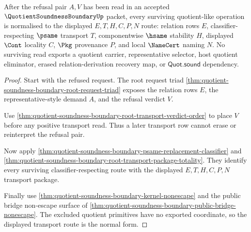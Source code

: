 \begin{theorem}
\label{thm:quotient-soundness-boundary-transport-refusal-normal-form}
After the refusal pair $A,V$ has been read in an accepted
$\QuotientSoundnessBoundaryUp$ packet, every surviving quotient-like operation
is normalised to the displayed $E,T,H,C,P,N$ route: relation rows $E$,
classifier-respecting $\psame$ transport $T$, componentwise $\hsame$ stability
$H$, displayed $\Cont$ locality $C$, $\Pkg$ provenance $P$, and local
$\NameCert$ naming $N$. No surviving read exports a quotient carrier,
representative selector, host quotient eliminator, erased relation-derivation
recovery map, or $\mathsf{Quot.sound}$ dependency.
\end{theorem}
\begin{proof}
Start with the refused request. The root request triad
\autoref{thm:quotient-soundness-boundary-root-request-triad} exposes the
relation rows $E$, the representative-style demand $A$, and the refusal
verdict $V$.

Use \autoref{thm:quotient-soundness-boundary-root-transport-verdict-order} to
place $V$ before any positive transport read. Thus a later transport row cannot
erase or reinterpret the refusal pair.

Now apply \autoref{thm:quotient-soundness-boundary-psame-replacement-classifier}
and \autoref{thm:quotient-soundness-boundary-root-transport-package-totality}.
They identify every surviving classifier-respecting route with the displayed
$E,T,H,C,P,N$ transport package.

Finally use \autoref{thm:quotient-soundness-boundary-kernel-nonescape} and the
public bridge non-escape surface of
\autoref{thm:quotient-soundness-boundary-public-bridge-nonescape}. The
excluded quotient primitives have no exported coordinate, so the displayed
transport route is the normal form.
\end{proof}

